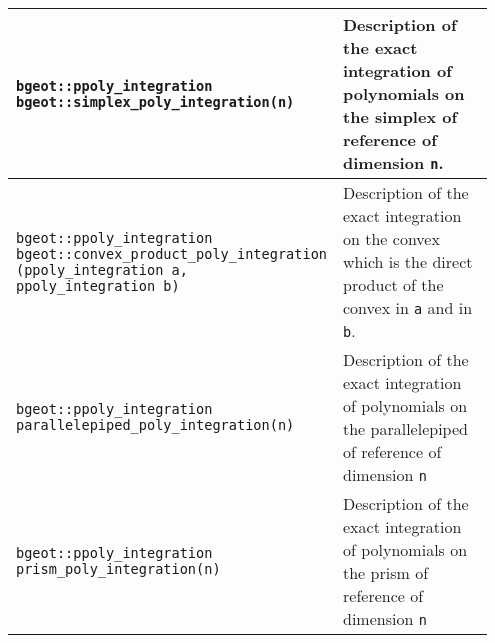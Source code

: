 \begin{center} \begin{tabular}{|m{0.55\linewidth}|m{0.4\linewidth}|} \hline
{\tt bgeot::ppoly\_integration bgeot::simplex\_poly\_integration(n)} & Description of the exact integration of polynomials on the simplex of reference of dimension {\tt n}. \\ \hline
{\tt bgeot::ppoly\_integration bgeot::convex\_product\_poly\_integration (ppoly\_integration a, ppoly\_integration b)} & Description of the exact integration on the convex which is the direct product of the convex in {\tt a} and in {\tt b}.\\ \hline
{\tt bgeot::ppoly\_integration parallelepiped\_poly\_integration(n)} & Description of the exact integration of polynomials on the parallelepiped of reference of dimension {\tt n}\\ \hline
{\tt bgeot::ppoly\_integration prism\_poly\_integration(n)} & Description of the exact integration of polynomials on the prism of reference of dimension {\tt n}\\ \hline
\end{tabular} \end{center}
